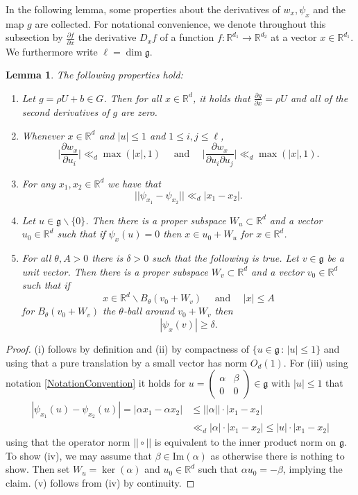 \documentclass[10pt, english,oneside,reqno]{amsart}
\theoremstyle{plain}
\newtheorem{lemma}[theorem]{Lemma}
\theoremstyle{remark}
\numberwithin{equation}{section}
\numberwithin{figure}{section}
\newcommand{\R}{\mathbb{R}}
\begin{document}
In the following lemma, some properties about the derivatives of $w_x, \psi_x$ and the map $g$ are collected. For notational convenience, we denote throughout this subsection by $\frac{\partial f}{\partial x}$ the derivative $D_x f$ of a function $f: \R^{d_1} \to \R^{d_2}$ at a vector $x \in \R^{d_1}$. We furthermore write $\ell = \dim \mathfrak{g}$.

\begin{lemma}\label{BasicDerivativeProp}
    The following properties hold:
    \begin{enumerate}[label = (\roman*)]
        \item Let $g = \rho U + b \in G$. Then for all $x \in \R^d$, it holds that $\frac{\partial g}{\partial x} = \rho U$ and all of the second derivatives of $g$ are zero.
        \item Whenever $x \in \R^d$ and $|u| \leq 1$ and $1 \leq i,j \leq \ell$, $$\bigg| \frac{\partial w_x}{\partial u_i} \bigg| \ll_d \max(|x|,1) \quad \text{ and }\quad \bigg| \frac{\partial w_x}{\partial u_i \partial u_j}\bigg| \ll_d \max(|x|,1) .$$
        \item For any $x_1, x_2 \in \R^d$ we have that $$||\psi_{x_1} - \psi_{x_2}|| \ll_d |x_1 - x_2|.$$
        \item Let $u \in \mathfrak{g} \backslash \{ 0 \}$. Then there is a proper subspace $W_u \subset \R^d$ and a vector $u_0 \in \R^d$ such that if $\psi_x(u) = 0$ then $x \in u_0 + W_u$ for $x \in \R^d$.
        \item For all $\theta, A > 0$ there is $\delta > 0$ such that the following is true. Let $v \in \mathfrak{g}$ be a unit vector. Then there is a proper subspace $W_v \subset \R^d$ and a vector $v_0 \in \R^d$ such that if $$x \in \R^d \backslash B_{\theta}(v_0 + W_v) \quad\text{ and } \quad |x| \leq A$$ for $B_{\theta}(v_0 + W_v)$ the $\theta$-ball around $v_0 + W_v$ then $$|\psi_x(v)| \geq \delta.$$
    \end{enumerate}
\end{lemma}

\begin{proof}
    (i) follows by definition and (ii) by compactness of $\{u\in \mathfrak{g} \,:\, |u| \leq 1 \}$ and using that a pure translation by a small vector has norm $O_d(1)$. For (iii) using notation \eqref{NotationConvention} it holds for $u = (\begin{smallmatrix}
        \alpha & \beta \\ 0 & 0
    \end{smallmatrix}) \in \mathfrak{g}$ with $|u| \leq 1$ that 
    \begin{align*}
        |\psi_{x_1}(u) - \psi_{x_2}(u)| = |\alpha x_1 - \alpha x_2| &\leq ||\alpha||\cdot |x_1 - x_2| \\ &\ll_d |\alpha| \cdot |x_1 - x_2| \leq |u|\cdot |x_1 - x_2|
    \end{align*}
    using that the operator norm $||\circ||$ is equivalent to the inner product norm on $\mathfrak{g}$. To show (iv),  we may assume that $\beta \in \mathrm{Im}(\alpha)$ as otherwise there is nothing to show. Then set $W_u = \ker(\alpha)$ and $u_0 \in \R^d$ such that $\alpha u_0 = -\beta$, implying the claim.  (v) follows from (iv) by continuity.
\end{proof}
\end{document}
